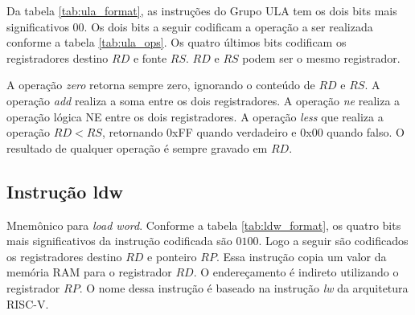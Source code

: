 \documentclass[a4paper, 12pt]{article}
\begin{document}
\begin{table}[ht]
	\centering
	\caption{Codificação das operações}
	\label{tab:ula_ops}
\end{table}

\par
Da tabela \ref{tab:ula_format}, as instruções do Grupo ULA tem os dois bits mais significativos $00$.
Os dois bits a seguir codificam a operação a ser realizada conforme a tabela \ref{tab:ula_ops}.
Os quatro últimos bits codificam os registradores destino $RD$ e fonte $RS$. $RD$ e $RS$ podem ser
o mesmo registrador.
\par
A operação \textit{zero} retorna sempre zero, ignorando o conteúdo de $RD$ e $RS$.
A operação \textit{add} realiza a soma entre os dois registradores.
A operação \textit{ne} realiza a operação lógica NE entre os dois registradores.
A operação \textit{less} que realiza a operação $RD < RS$, retornando 0xFF quando verdadeiro e 0x00 quando falso.
O resultado de qualquer operação é sempre gravado em $RD$.


\subsection{Instrução ldw}

\begin{table}[ht]
	\centering
	\caption{Formato da instrução codificada \textit{ldw}}
	\label{tab:ldw_format}
\end{table}
\par

Mnemônico para \textit{load word}. Conforme a tabela \ref{tab:ldw_format}, os 
quatro bits mais significativos da instrução codificada são $0100$.
Logo a seguir são codificados os registradores destino $RD$ e ponteiro $RP$.
Essa instrução copia um valor da memória RAM para o registrador $RD$.
O endereçamento é indireto utilizando o registrador $RP$.
O nome dessa instrução é baseado na instrução \textit{lw} da arquitetura RISC-V.
\end{document}
